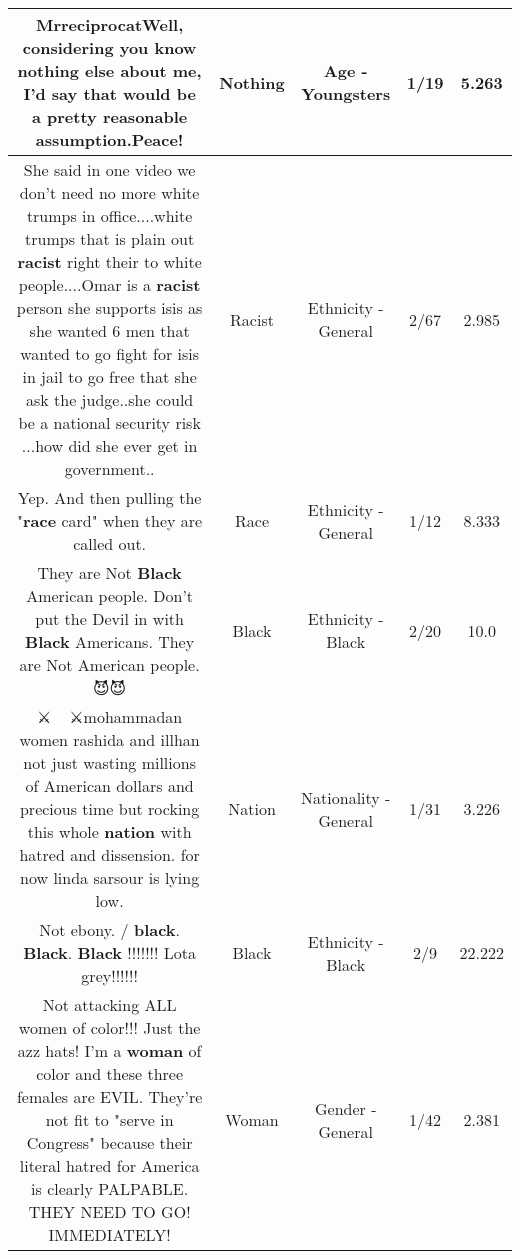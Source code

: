 \documentclass[11pt]{article}
\newlength\mylength
\begin{document}
\begin{center}
\begin{longtable}{|C{.65\mylength}|C{.30\mylength}|C{.12\mylength}|C{.12\mylength}|C{.12\mylength}|}
  \small MrreciprocatWell, considering you know \textbf{nothing} else about me, I'd say that would be a pretty reasonable assumption.Peace!\normalsize   & Nothing & Age - Youngsters & 1/19 & 5.263 \\  \hline
  \small She said in one video we don't need no more white trumps in office....white trumps that is plain out \textbf{racist} right their to white people....Omar is a \textbf{racist} person she supports isis as she wanted 6 men that wanted to go fight for isis in jail to go free that she ask the judge..she could be a national security risk ...how did she ever get in government..\normalsize   & Racist & Ethnicity - General & 2/67 & 2.985 \\  \hline
  \small Yep. And then pulling the "\textbf{race} card" when they are called out.\normalsize   & Race & Ethnicity - General & 1/12 & 8.333 \\  \hline
  \small They are Not \textbf{Black} American people. Don't put the Devil in with \textbf{Black} Americans. They are Not American people. 😈😈\normalsize   & Black & Ethnicity - Black & 2/20 & 10.0 \\  \hline
  \small ⚔️🌙🧕🧕🌙⚔️mohammadan women rashida and illhan not just wasting millions of American dollars and precious time but rocking this whole \textbf{nation} with hatred and dissension.  for now linda sarsour is lying low.\normalsize   & Nation & Nationality - General & 1/31 & 3.226 \\  \hline
  \small Not ebony.  / \textbf{black}. \textbf{Black}.  \textbf{Black} !!!!!!! Lota grey!!!!!!\normalsize   & Black & Ethnicity - Black & 2/9 & 22.222 \\  \hline
  \small Not attacking ALL women of color!!!  Just the azz hats!  I'm a \textbf{woman} of color and these three females are EVIL.  They're not fit to "serve in Congress" because their literal hatred for America is clearly PALPABLE.  THEY NEED TO GO!  IMMEDIATELY!\normalsize   & Woman & Gender - General & 1/42 & 2.381 \\  \hline

\end{longtable}
\end{center}
\end{document}
